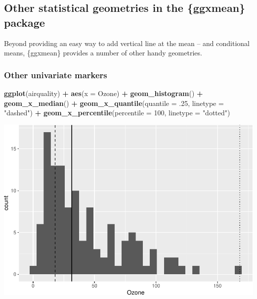 \documentclass[12pt]{article}
\newenvironment{Shaded}{\begin{snugshade}}{\end{snugshade}}
\newcommand{\DataTypeTok}[1]{\textcolor[rgb]{0.13,0.29,0.53}{#1}}
\newcommand{\DecValTok}[1]{\textcolor[rgb]{0.00,0.00,0.81}{#1}}
\newcommand{\FloatTok}[1]{\textcolor[rgb]{0.00,0.00,0.81}{#1}}
\newcommand{\KeywordTok}[1]{\textcolor[rgb]{0.13,0.29,0.53}{\textbf{#1}}}
\newcommand{\NormalTok}[1]{#1}
\newcommand{\OperatorTok}[1]{\textcolor[rgb]{0.81,0.36,0.00}{\textbf{#1}}}
\newcommand{\StringTok}[1]{\textcolor[rgb]{0.31,0.60,0.02}{#1}}
\begin{document}
\hypertarget{other-statistical-geometries-in-the-ggxmean-package}{%
\subsection{Other statistical geometries in the \{ggxmean\}
package}\label{other-statistical-geometries-in-the-ggxmean-package}}

Beyond providing an easy way to add vertical line at the mean -- and
conditional means, \{ggxmean\} provides a number of other handy
geometries.

\hypertarget{other-univariate-markers}{%
\subsubsection{Other univariate
markers}\label{other-univariate-markers}}

\begin{Shaded}
\begin{Highlighting}[]
\KeywordTok{ggplot}\NormalTok{(airquality) }\OperatorTok{+}\StringTok{ }
\StringTok{  }\KeywordTok{aes}\NormalTok{(}\DataTypeTok{x =}\NormalTok{ Ozone) }\OperatorTok{+}\StringTok{ }
\StringTok{  }\KeywordTok{geom_histogram}\NormalTok{() }\OperatorTok{+}\StringTok{ }
\StringTok{  }\KeywordTok{geom_x_median}\NormalTok{() }\OperatorTok{+}\StringTok{ }
\StringTok{  }\KeywordTok{geom_x_quantile}\NormalTok{(}\DataTypeTok{quantile =} \FloatTok{.25}\NormalTok{,}
                  \DataTypeTok{linetype =} \StringTok{"dashed"}\NormalTok{) }\OperatorTok{+}\StringTok{ }
\StringTok{  }\KeywordTok{geom_x_percentile}\NormalTok{(}\DataTypeTok{percentile =} \DecValTok{100}\NormalTok{,}
                    \DataTypeTok{linetype =} \StringTok{"dotted"}\NormalTok{)}
\end{Highlighting}
\end{Shaded}

\begin{center}\includegraphics[width=0.5\linewidth]{manuscript_files/figure-latex/unnamed-chunk-6-1} \end{center}
\end{document}

